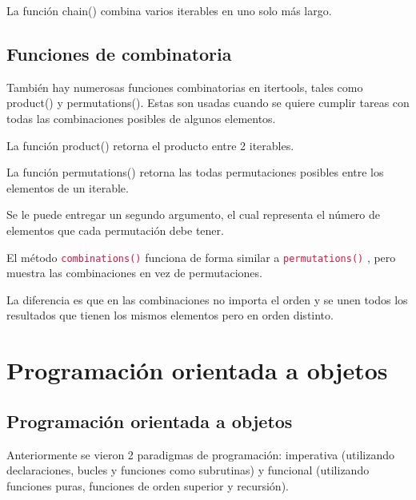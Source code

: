 \documentclass{report}
\newcommand{\ttt}[1]{
  \textcolor{Crimson}{\texttt{#1}}
}
\begin{document}
La función chain() combina varios iterables en uno solo más largo.


\section{Funciones de combinatoria}

También hay numerosas funciones combinatorias en itertools, tales como product() y permutations(). Estas son usadas cuando se quiere cumplir tareas con todas las combinaciones posibles de algunos elementos.\smallskip

La función product() retorna el producto entre 2 iterables.


La función permutations() retorna las todas permutaciones posibles entre los elementos de un iterable.



Se le puede entregar un segundo argumento, el cual representa el número de elementos que cada permutación debe tener.


El método \ttt{combinations()} funciona de forma similar a \ttt{permutations()}, pero muestra las combinaciones en vez de permutaciones.


La diferencia es que en las combinaciones no importa el orden y se unen todos los resultados que tienen los mismos elementos pero en orden distinto.

\clearpage\chapter{Programación orientada a objetos}


\section{Programación orientada a objetos}

Anteriormente se vieron 2 paradigmas de programación: imperativa (utilizando declaraciones, bucles y funciones como subrutinas) y funcional (utilizando funciones puras, funciones de orden superior y recursión).\smallskip
\end{document}
